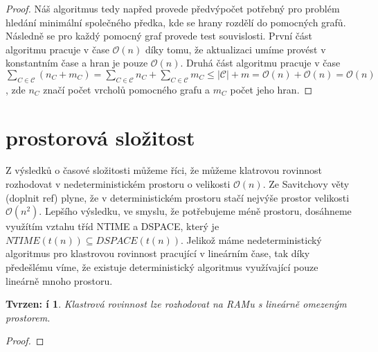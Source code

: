 \documentclass[12pt,a4report]{report}
\newtheorem{tvr}{Tvrzen: í}[chapter]
\begin{document}
\begin{proof}
Náš algoritmus tedy napřed provede předvýpočet potřebný pro problém hledání minimální společného předka, kde se hrany rozdělí do pomocných grafů. Následně se pro každý pomocný graf provede test souvislosti. První část algoritmu pracuje v čase $\mathcal{O}(n)$ díky tomu, že aktualizaci umíme provést v konstantním čase a hran je pouze $\mathcal{O}(n)$. Druhá část algoritmu pracuje v čase $\sum\limits_{C \in \mathcal C}(n_C+m_C) = \sum\limits_{C \in \mathcal C}n_C + \sum\limits_{C \in \mathcal C}m_C \leq |\mathcal C| + m = \mathcal O(n) + \mathcal O(n)=\mathcal O(n)$, zde $n_C$ značí počet vrcholů pomocného grafu a $m_C$ počet jeho hran.
\end{proof}

\section{prostorová složitost}
Z výsledků o časové složitosti můžeme říci, že můžeme klatrovou rovinnost rozhodovat v nedeterministickém prostoru o velikosti $\mathcal{O}(n)$. Ze Savitchovy věty (doplnit ref) plyne, že v deterministickém prostoru stačí nejvýše prostor velikosti $\mathcal{O}(n^2)$.
Lepšího výsledku, ve smyslu, že potřebujeme méně prostoru, dosáhneme využítím vztahu tříd NTIME a DSPACE, který je $NTIME(t(n)) \subseteq DSPACE(t(n))$. Jelikož máme nedeterministický algoritmus pro klastrovou rovinnost pracující v lineárním čase, tak díky předešlému víme, že existuje deterministický algoritmus využívající pouze lineárně mnoho prostoru.
\begin{tvr}
Klastrová rovinnost lze rozhodovat na RAMu s lineárně omezeným prostorem.
\end{tvr}
\begin{proof}
\end{proof}
\end{document}
